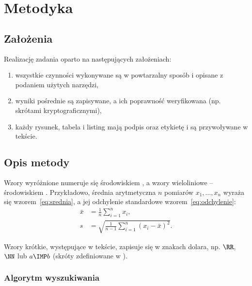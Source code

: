 \chapter{Metodyka}\label{ch:metodyka}


\section{Założenia}\label{sec:zalozenia}

Realizację zadania oparto na następujących założeniach:
\begin{enumerate}
    \item wszystkie czynności wykonywane są w powtarzalny sposób i opisane z podaniem użytych narzędzi,
    \item wyniki pośrednie są zapisywane, a ich poprawność weryfikowana (np. skrótami kryptograficznymi),
    \item każdy rysunek, tabela i listing mają podpis oraz etykietę i są przywoływane w tekście.
\end{enumerate}

\section{Opis metody}\label{sec:opis-metody}

Wzory wyróżnione numeruje się środowiskiem , a wzory wieloliniowe -- środowiskiem .
Przykładowo, średnia arytmetyczna $n$ pomiarów $x_1, \dots, x_n$ wyraża się wzorem~\eqref{eq:srednia}, a jej
odchylenie standardowe wzorem~\eqref{eq:odchylenie}:
\begin{align}
    \bar{x} &= \frac{1}{n} \sum_{i=1}^{n} x_i , \label{eq:srednia} \\
    s       &= \sqrt{\frac{1}{n-1} \sum_{i=1}^{n} \left( x_i - \bar{x} \right)^2} . \label{eq:odchylenie}
\end{align}

Wzory krótkie, występujące w tekście, zapisuje się w znakach dolara, np. $\RR$, $\NN$ lub $a \IMP b$
(skróty zdefiniowane w ).

\subsection{Algorytm wyszukiwania}\label{sec:algorytm}

